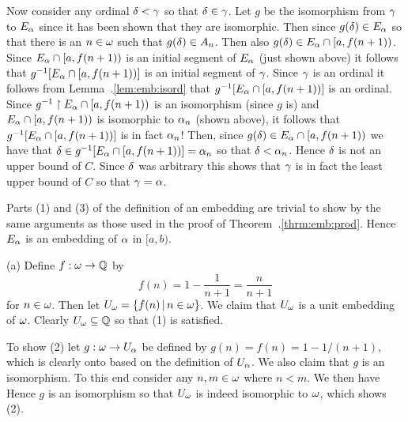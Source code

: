\begin{solution}
{        Now consider any ordinal $\delta < \gamma$ so that $\delta \in \gamma$.
        Let $g$ be the isomorphism from $\gamma$ to $E_\alpha$ since it has been shown that they are isomorphic.
        Then since $g(\delta) \in E_\alpha$ so that there is an $n \in \omega$ such that $g(\delta) \in A_n$.
        Then also $g(\delta) \in E_\alpha \cap [a, f(n+1))$.
        Since $E_\alpha \cap [a, f(n+1))$ is an initial segment of $E_\alpha$ (just shown above) it follows that $g^{-1}[E_\alpha \cap [a, f(n+1))]$ is an initial segment of $\gamma$.
        Since $\gamma$ is an ordinal it follows from Lemma~\ex.\ref{lem:emb:isord} that $g^{-1}[E_\alpha \cap [a, f(n+1))]$ is an ordinal.
        Since $g^{-1} \restriction E_\alpha \cap [a, f(n+1))$ is an isomorphism (since $g$ is) and $E_\alpha \cap [a, f(n+1))$ is isomorphic to $\alpha_n$ (shown above), it follows that $g^{-1}[E_\alpha \cap [a, f(n+1))]$ is in fact $\alpha_n$!
        Then, since $g(\delta) \in E_\alpha \cap [a, f(n+1))$ we have that $\delta \in g^{-1}[E_\alpha \cap [a, f(n+1))] = \alpha_n$ so that $\delta < \alpha_n$.
        Hence $\delta$ is not an upper bound of $C$.
        Since $\delta$ was arbitrary this shows that $\gamma$ is in fact the least upper bound of $C$ so that $\gamma = \alpha$.

        Parts (1) and (3) of the definition of an embedding are trivial to show by the same arguments as those used in the proof of Theorem~\ex.\ref{thrm:emb:prod}.
        Hence $E_\alpha$ is an embedding of $\alpha$ in $[a,b)$. \qedsymbol
    }
    
    \mainprob

    (a) Define $f: \omega \to \mathbb{Q}$ by
    $$
    f(n) = 1 - \frac{1}{n+1} = \frac{n}{n+1}
    $$
    for $n \in \omega$.
    Then let $U_\omega = \left\{ f(n) \,|\, n \in \omega \right\}$.
    We claim that $U_\omega$ is a unit embedding of $\omega$.
    Clearly $U_\omega \subseteq \mathbb{Q}$ so that (1) is satisfied.

    To show (2) let $g: \omega \to U_\alpha$ be defined by $g(n) = f(n) = 1 - 1/(n+1)$, which is clearly onto based on the definition of $U_\alpha$.
    We also claim that $g$ is an isomorphism.
    To this end consider any $n,m \in \omega$ where $n < m$.
    We then have
    Hence $g$ is an isomorphism so that $U_\omega$ is indeed isomorphic to $\omega$, which shows (2).


\end{solution}
